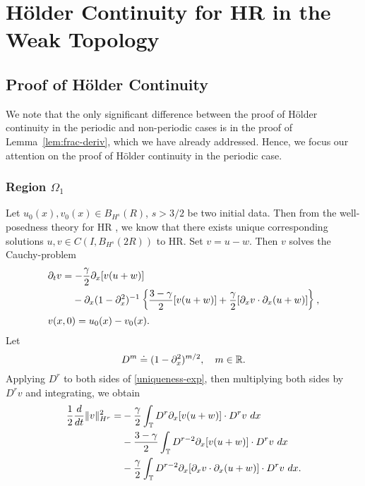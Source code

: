 %
%
\chapter{H\"older Continuity for HR in the Weak Topology}
%
%
%
%
%
%
\section{Proof of H\"older Continuity}
%
%
We note that the only significant difference between the proof of H\"older
continuity in the periodic and non-periodic cases is in the proof of Lemma~\ref{lem:frac-deriv}, which we have already addressed. Hence, we focus our
attention on the proof of H\"older continuity in the periodic case. 
%
%
\subsection{Region $\Omega_{1}$} 
\label{ssec:reg-m-imp}
%
%
Let $u_{0}(x), v_{0}(x)
\in B_{H^{s}}(R)$, $s > 3/2$ be two initial data. Then from
the well-posedness theory for HR \cite{Karapetyan:2010hk}, we
know that there exists unique corresponding solutions $u, v \in C(I,
B_{H^{s}}(2R))$ to HR\@.
Set $v=u-w$. Then $v$ solves the Cauchy-problem
%
%
\begin{align}
\label{uniqueness-exp}
& \p_t v
=  -\frac{\gamma}{2} \p_x [v(u + w)] 
\\
\notag
& \phantom{\p_t v = }-\p_x (1 - \p_{x}^{2})^{-1} \left\{
\frac{3-\gamma}{2}[v(u+w)] + \frac{\gamma}{2}[\p_x v \cdot \p_x (u+w)]
\right\},
\\
& v(x,0) = u_{0}(x) - v_{0}(x).
\label{uniqueness-init-data}
\end{align}
%
%
%
Let
\begin{equation*}
D^{m} \doteq (1 - \partial_x^2)^{m/2}, \quad m \in \mathbb{R}.
\end{equation*}
%
Applying $D^r$ to both sides of \eqref{uniqueness-exp}, then 
multiplying both sides by $D^r v$ and integrating, we obtain
%
%
\begin{equation}
\begin{split}
\frac{1}{2} \frac{d}{dt} \|v\|_{H^r}^2
= & -\frac{\gamma}{2} \int_{\mathbb{T}} D^r \partial_x [v(u+w)] \cdot
D^r v \ dx
\\
& - \frac{3-\gamma}{2} \int_{\mathbb{T}}  D^{r -2}
\partial_x[v(u+w)] \cdot
D^r v \ dx  
\\
& - \frac{\gamma}{2} \int_{\mathbb{T}} D^{r 
-2} \partial_x [ \partial_x v
\cdot \partial_x (u+w)]\cdot D^r v \ dx.
\label{2v-iu}
\end{split}
\end{equation}
